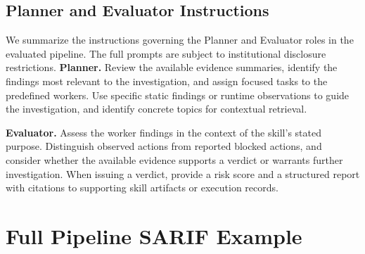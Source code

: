 






\subsection{Planner and Evaluator Instructions}
\label{app:agent-instructions}

We summarize the instructions governing the Planner and
Evaluator roles in the evaluated pipeline. The full prompts
are subject to institutional disclosure restrictions.
\noindent\textbf{Planner.}
Review the available evidence summaries, identify the
findings most relevant to the investigation, and assign
focused tasks to the predefined workers. Use specific static
findings or runtime observations to guide the investigation,
and identify concrete topics for contextual retrieval.

\smallskip
\noindent\textbf{Evaluator.}
Assess the worker findings in the context of the skill's
stated purpose. Distinguish observed actions from reported
blocked actions, and consider whether the available evidence
supports a verdict or warrants further investigation.
When issuing a verdict, provide a risk score and a structured
report with citations to supporting skill artifacts or
execution records.

\section{Full Pipeline SARIF Example}
\label{app:full_pipeline_sarif_example}

